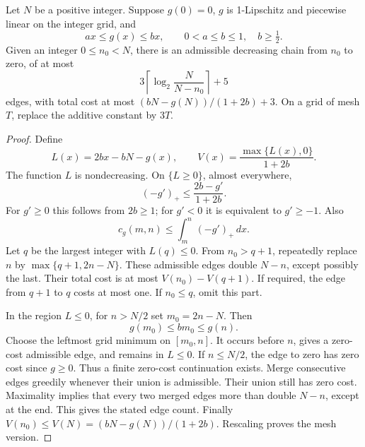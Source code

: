 \begin{lemma}\label{fprof:chain}
Let \(N\) be a positive integer. Suppose \(g(0)=0\), \(g\) is 1-Lipschitz and piecewise linear on the integer grid, and
$$
 ax\leq g(x)\leq bx,\qquad
 0<a\leq b\leq1,\quad b\geq\tfrac12.
$$
Given an integer \(0\leq n_0<N\), there is an admissible decreasing chain from \(n_0\) to zero, of at most
$$
 3\left\lceil\log_2\frac{N}{N-n_0}\right\rceil+5
$$
edges, with total cost at most \((bN-g(N))/(1+2b)+3\).
On a grid of mesh \(T\), replace the additive constant by \(3T\).
\end{lemma}
\begin{proof}
Define
$$
 L(x)=2bx-bN-g(x),\qquad V(x)=\frac{\max\{L(x),0\}}{1+2b}.
$$
The function \(L\) is nondecreasing. On \(\{L\geq0\}\), almost everywhere,
$$
 (-g')_+\leq\frac{2b-g'}{1+2b}.
$$
For \(g'\geq0\) this follows from \(2b\geq1\); for \(g'<0\) it is equivalent to \(g'\geq-1\). Also
$$
 c_g(m,n)\leq\int_m^n(-g')_+\,dx.
$$
Let \(q\) be the largest integer with \(L(q)\leq0\). From \(n_0>q+1\), repeatedly replace \(n\) by \(\max\{q+1,2n-N\}\). These admissible edges double \(N-n\), except possibly the last. Their total cost is at most \(V(n_0)-V(q+1)\). If required, the edge from \(q+1\) to \(q\) costs at most one. If \(n_0\leq q\), omit this part.

In the region \(L\leq0\), for \(n>N/2\) set \(m_0=2n-N\). Then
$$
 g(m_0)\leq bm_0\leq g(n).
$$
Choose the leftmost grid minimum on \([m_0,n]\). It occurs before \(n\), gives a zero-cost admissible edge, and remains in \(L\leq0\). If \(n\leq N/2\), the edge to zero has zero cost since \(g\geq0\). Thus a finite zero-cost continuation exists. Merge consecutive edges greedily whenever their union is admissible. Their union still has zero cost. Maximality implies that every two merged edges more than double \(N-n\), except at the end. This gives the stated edge count. Finally \(V(n_0)\leq V(N)=(bN-g(N))/(1+2b)\). Rescaling proves the mesh version.
\end{proof}

